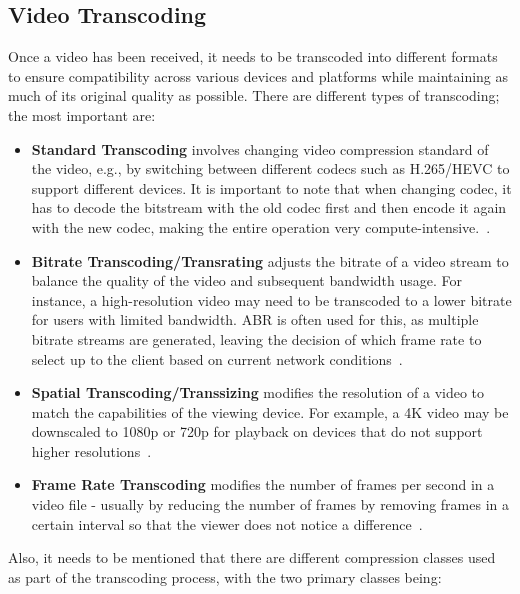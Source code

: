 \subsection{Video Transcoding}
Once a video has been received, it needs to be transcoded into different formats to ensure compatibility across various devices and platforms while maintaining as much of its original quality as possible. There are different types of transcoding; the most important are:

\begin{itemize}
    \item \textbf{Standard Transcoding} involves changing video compression standard of the video, e.g., by switching between different codecs such as H.265/HEVC to support different devices. It is important to note that when changing codec, it has to decode the bitstream with the old codec first and then encode it again with the new codec, making the entire operation very compute-intensive.~\parencite{codec_transcoding}.
    \item \textbf{Bitrate Transcoding/Transrating} adjusts the bitrate of a video stream to balance the quality of the video and subsequent bandwidth usage. For instance, a high-resolution video may need to be transcoded to a lower bitrate for users with limited bandwidth. \ac{ABR} is often used for this, as multiple bitrate streams are generated, leaving the decision of which frame rate to select up to the client based on current network conditions~\parencite{transcoding}.
    \item \textbf{Spatial Transcoding/Transsizing} modifies the resolution of a video to match the capabilities of the viewing device. For example, a 4K video may be downscaled to 1080p or 720p for playback on devices that do not support higher resolutions~\parencite{cloud_streaming}.
    \item \textbf{Frame Rate Transcoding} modifies the number of frames per second in a video file - usually by reducing the number of frames by removing frames in a certain interval so that the viewer does not notice a difference~\parencite{transcoding}.
\end{itemize}

Also, it needs to be mentioned that there are different compression classes used as part of the transcoding process, with the two primary classes being:

